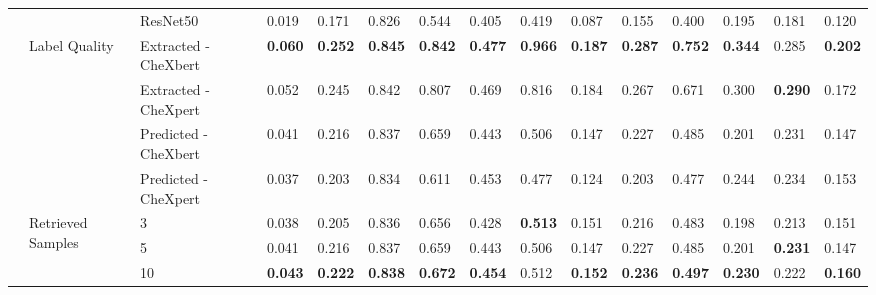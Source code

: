 \begin{tabular}{lllllllllllllll}
 &  & ResNet50 & 0.019 & 0.171 & 0.826 & 0.544 & 0.405 & 0.419 & 0.087 & 0.155 & 0.400 & 0.195 & 0.181 & 0.120 \\
\cmidrule{2-15}
 & \multirow[c]{4}{*}{Label Quality} & Extracted - CheXbert & \textbf{0.060} & \textbf{0.252} & \textbf{0.845} & \textbf{0.842} & \textbf{0.477} & \textbf{0.966} & \textbf{0.187} & \textbf{0.287} & \textbf{0.752} & \textbf{0.344} & 0.285 & \textbf{0.202} \\
 &  & Extracted - CheXpert & 0.052 & 0.245 & 0.842 & 0.807 & 0.469 & 0.816 & 0.184 & 0.267 & 0.671 & 0.300 & \textbf{0.290} & 0.172 \\
 &  & Predicted - CheXbert & 0.041 & 0.216 & 0.837 & 0.659 & 0.443 & 0.506 & 0.147 & 0.227 & 0.485 & 0.201 & 0.231 & 0.147 \\
 &  & Predicted - CheXpert & 0.037 & 0.203 & 0.834 & 0.611 & 0.453 & 0.477 & 0.124 & 0.203 & 0.477 & 0.244 & 0.234 & 0.153 \\
\cmidrule{2-15}
 & \multirow[c]{3}{*}{Retrieved Samples} & 3 & 0.038 & 0.205 & 0.836 & 0.656 & 0.428 & \textbf{0.513} & 0.151 & 0.216 & 0.483 & 0.198 & 0.213 & 0.151 \\
 &  & 5 & 0.041 & 0.216 & 0.837 & 0.659 & 0.443 & 0.506 & 0.147 & 0.227 & 0.485 & 0.201 & \textbf{0.231} & 0.147 \\
 &  & 10 & \textbf{0.043} & \textbf{0.222} & \textbf{0.838} & \textbf{0.672} & \textbf{0.454} & 0.512 & \textbf{0.152} & \textbf{0.236} & \textbf{0.497} & \textbf{0.230} & 0.222 & \textbf{0.160} \\
\cmidrule{1-15} \cmidrule{2-15}
\bottomrule
\end{tabular}

